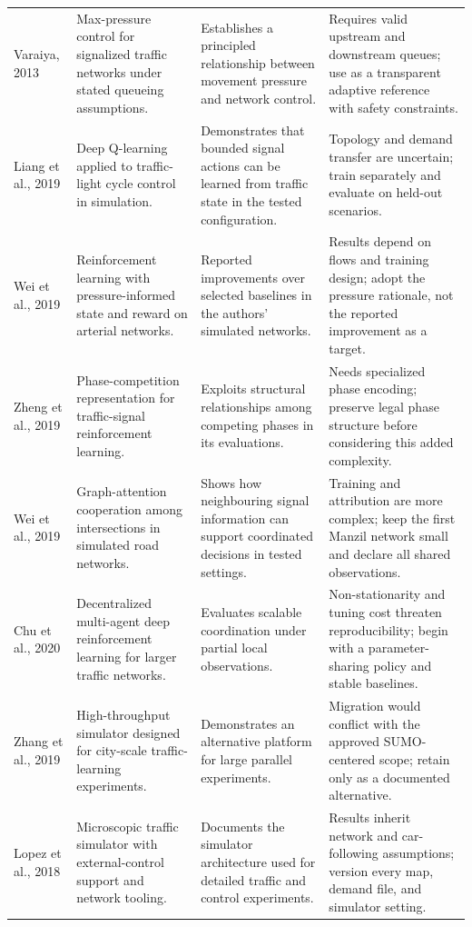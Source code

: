 \begin{longtable}{P{0.18\textwidth}P{0.23\textwidth}P{0.24\textwidth}P{0.20\textwidth}}
Varaiya, 2013 \cite{varaiya2013maxpressure} & Max-pressure control for signalized traffic networks under stated queueing assumptions. & Establishes a principled relationship between movement pressure and network control. & Requires valid upstream and downstream queues; use as a transparent adaptive reference with safety constraints.\\
Liang et al., 2019 \cite{liang2019dqn} & Deep Q-learning applied to traffic-light cycle control in simulation. & Demonstrates that bounded signal actions can be learned from traffic state in the tested configuration. & Topology and demand transfer are uncertain; train separately and evaluate on held-out scenarios.\\
Wei et al., 2019 \cite{wei2019presslight} & Reinforcement learning with pressure-informed state and reward on arterial networks. & Reported improvements over selected baselines in the authors' simulated networks. & Results depend on flows and training design; adopt the pressure rationale, not the reported improvement as a target.\\
Zheng et al., 2019 \cite{zheng2019frap} & Phase-competition representation for traffic-signal reinforcement learning. & Exploits structural relationships among competing phases in its evaluations. & Needs specialized phase encoding; preserve legal phase structure before considering this added complexity.\\
Wei et al., 2019 \cite{wei2019colight} & Graph-attention cooperation among intersections in simulated road networks. & Shows how neighbouring signal information can support coordinated decisions in tested settings. & Training and attribution are more complex; keep the first Manzil network small and declare all shared observations.\\
Chu et al., 2020 \cite{chu2020marl} & Decentralized multi-agent deep reinforcement learning for larger traffic networks. & Evaluates scalable coordination under partial local observations. & Non-stationarity and tuning cost threaten reproducibility; begin with a parameter-sharing policy and stable baselines.\\
Zhang et al., 2019 \cite{zhang2019cityflow} & High-throughput simulator designed for city-scale traffic-learning experiments. & Demonstrates an alternative platform for large parallel experiments. & Migration would conflict with the approved SUMO-centered scope; retain only as a documented alternative.\\
Lopez et al., 2018 \cite{lopez2018sumo} & Microscopic traffic simulator with external-control support and network tooling. & Documents the simulator architecture used for detailed traffic and control experiments. & Results inherit network and car-following assumptions; version every map, demand file, and simulator setting.\\

\end{longtable}
